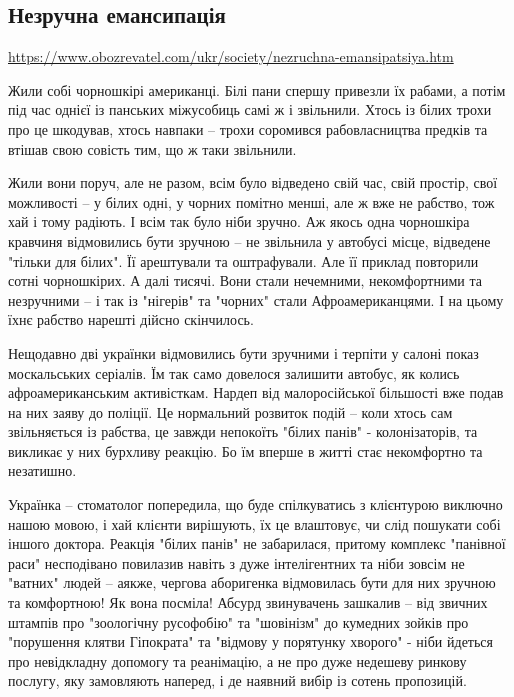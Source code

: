  
 

\subsection{Незручна емансипація}

\url{https://www.obozrevatel.com/ukr/society/nezruchna-emansipatsiya.htm}

Жили собі чорношкірі американці. Білі пани спершу привезли їх рабами, а потім
під час однієї із панських міжусобиць самі ж і звільнили. Хтось із білих трохи
про це шкодував, хтось навпаки – трохи соромився рабовласництва предків та
втішав свою совість тим, що ж таки звільнили.

Жили вони поруч, але не разом, всім було відведено свій час, свій простір, свої
можливості – у білих одні, у чорних помітно менші, але ж вже не рабство, тож
хай і тому радіють. І всім так було ніби зручно. Аж якось одна чорношкіра
кравчиня відмовились бути зручною – не звільнила у автобусі місце, відведене
"тільки для білих". Її арештували та оштрафували. Але її приклад повторили
сотні чорношкірих. А далі тисячі. Вони стали нечемними, некомфортними та
незручними – і так із "нігерів" та "чорних" стали Афроамериканцями. І на цьому
їхнє рабство нарешті дійсно скінчилось.

Нещодавно дві українки відмовились бути зручними і терпіти у салоні показ
москальських серіалів. Їм так само довелося залишити автобус, як колись
афроамериканським активісткам. Нардеп від малоросійської більшості вже подав на
них заяву до поліції. Це нормальний розвиток подій – коли хтось сам
звільняється із рабства, це завжди непокоїть "білих панів" - колонізаторів, та
викликає у них бурхливу реакцію. Бо їм вперше в житті стає некомфортно та
незатишно.

Українка – стоматолог попередила, що буде спілкуватись з клієнтурою виключно
нашою мовою, і хай клієнти вирішують, їх це влаштовує, чи слід пошукати собі
іншого доктора. Реакція "білих панів" не забарилася, притому комплекс "панівної
раси" несподівано повилазив навіть з дуже інтелігентних та ніби зовсім не
"ватних" людей – аякже, чергова аборигенка відмовилась бути для них зручною та
комфортною! Як вона посміла! Абсурд звинувачень зашкалив – від звичних штампів
про "зоологічну русофобію" та "шовінізм" до кумедних зойків про "порушення
клятви Гіпократа" та "відмову у порятунку хворого" - ніби йдеться про
невідкладну допомогу та реанімацію, а не про дуже недешеву ринкову послугу, яку
замовляють наперед, і де наявний вибір із сотень пропозицій.

